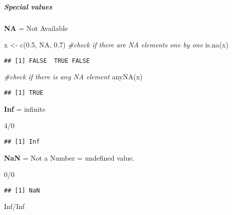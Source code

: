 \documentclass[
]{article}
\newenvironment{Shaded}{\begin{snugshade}}{\end{snugshade}}
\newcommand{\CommentTok}[1]{\textcolor[rgb]{0.56,0.35,0.01}{\textit{#1}}}
\newcommand{\ConstantTok}[1]{\textcolor[rgb]{0.00,0.00,0.00}{#1}}
\newcommand{\DecValTok}[1]{\textcolor[rgb]{0.00,0.00,0.81}{#1}}
\newcommand{\FloatTok}[1]{\textcolor[rgb]{0.00,0.00,0.81}{#1}}
\newcommand{\FunctionTok}[1]{\textcolor[rgb]{0.00,0.00,0.00}{#1}}
\newcommand{\NormalTok}[1]{#1}
\newcommand{\OtherTok}[1]{\textcolor[rgb]{0.56,0.35,0.01}{#1}}
\newcommand{\SpecialCharTok}[1]{\textcolor[rgb]{0.00,0.00,0.00}{#1}}
\begin{document}
\hypertarget{special-values}{%
\subparagraph{Special values}\label{special-values}}

\textbf{NA} = Not Available

\begin{Shaded}
\begin{Highlighting}[]
\NormalTok{x }\OtherTok{\textless{}{-}} \FunctionTok{c}\NormalTok{(}\FloatTok{0.5}\NormalTok{, }\ConstantTok{NA}\NormalTok{, }\FloatTok{0.7}\NormalTok{)}
\CommentTok{\#check if there are NA elements one by one}
\FunctionTok{is.na}\NormalTok{(x)}
\end{Highlighting}
\end{Shaded}

\begin{verbatim}
## [1] FALSE  TRUE FALSE
\end{verbatim}

\begin{Shaded}
\begin{Highlighting}[]
\CommentTok{\#check if there is any NA element}
\FunctionTok{anyNA}\NormalTok{(x)}
\end{Highlighting}
\end{Shaded}

\begin{verbatim}
## [1] TRUE
\end{verbatim}

\textbf{Inf} = infinite

\begin{Shaded}
\begin{Highlighting}[]
\DecValTok{4}\SpecialCharTok{/}\DecValTok{0}
\end{Highlighting}
\end{Shaded}

\begin{verbatim}
## [1] Inf
\end{verbatim}

\textbf{NaN} = Not a Number = undefined value.

\begin{Shaded}
\begin{Highlighting}[]
\DecValTok{0}\SpecialCharTok{/}\DecValTok{0}
\end{Highlighting}
\end{Shaded}

\begin{verbatim}
## [1] NaN
\end{verbatim}

\begin{Shaded}
\begin{Highlighting}[]
\ConstantTok{Inf}\SpecialCharTok{/}\ConstantTok{Inf}
\end{Highlighting}
\end{Shaded}
\end{document}
